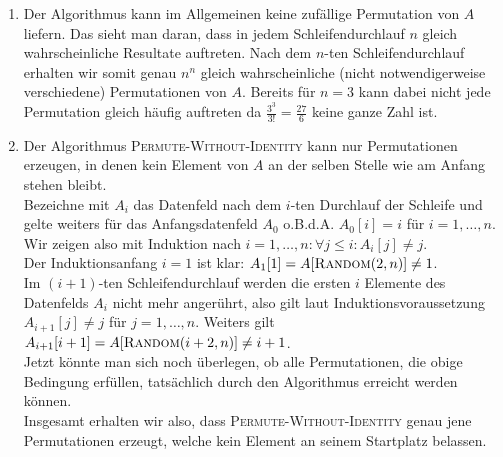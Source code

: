 \begin{solution}

\phantom{}

\begin{enumerate}[label = \alph*)]
  \item Der Algorithmus kann im Allgemeinen keine zufällige Permutation von $A$ liefern.
  Das sieht man daran, dass in jedem Schleifendurchlauf $n$ gleich wahrscheinliche
  Resultate auftreten. Nach dem $n$-ten Schleifendurchlauf erhalten wir somit
  genau $n^n$ gleich wahrscheinliche (nicht notwendigerweise verschiedene) Permutationen von $A$. Bereits für $n = 3$
  kann dabei nicht jede Permutation gleich häufig auftreten da $\frac{3^3}{3!} = \frac{27}{6}$
  keine ganze Zahl ist.
  \item Der Algorithmus \textsc{Permute-Without-Identity} kann nur Permutationen
  erzeugen, in denen kein Element von $A$ an der selben Stelle wie am Anfang stehen bleibt. \\
  Bezeichne mit $A_i$ das Datenfeld nach dem $i$-ten Durchlauf der Schleife und
  gelte weiters für das Anfangsdatenfeld $A_0$ o.B.d.A. $A_0[i] = i$ für $i = 1,\dots,n$. \\
  Wir zeigen also mit Induktion nach $i = 1,\dots,n: \forall j \leq i: A_i[j] \neq j$. \\
  Der Induktionsanfang $i = 1$ ist klar: $A_1[1] = A[\textsc{Random}(2,n)] \neq 1$. \\
  Im $(i+1)$-ten Schleifendurchlauf werden die ersten $i$ Elemente des Datenfelds $A_i$
  nicht mehr angerührt, also gilt laut Induktionsvoraussetzung $A_{i+1}[j] \neq j$
  für $j = 1,\dots,n$. Weiters gilt $A_{i+1}[i+1] = A[\textsc{Random}(i+2,n)] \neq i +1$. \\
  Jetzt könnte man sich noch überlegen, ob alle Permutationen, die obige
  Bedingung erfüllen, tatsächlich durch den Algorithmus erreicht werden können. \\
  Insgesamt erhalten wir also, dass \textsc{Permute-Without-Identity}
  genau jene Permutationen erzeugt, welche kein Element an seinem Startplatz belassen.
\end{enumerate}

\end{solution}
